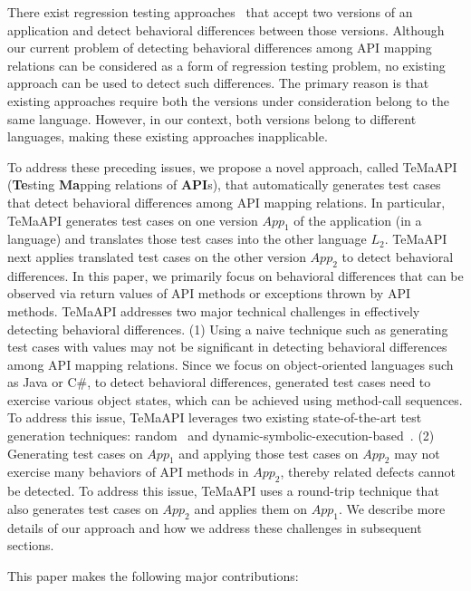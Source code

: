 There exist regression testing approaches~\cite{taneja08diffgen, robert07difference} that accept two versions of an application and detect behavioral differences between those versions. Although our current problem of detecting behavioral differences among API mapping relations can be considered as a form of regression testing problem, no existing approach can be used to detect such differences. The primary reason is that existing approaches require both the versions under consideration belong to the same language. However, in our context, both versions belong to different languages, making these existing approaches inapplicable. 

To address these preceding issues, we propose a novel approach, called TeMaAPI (\textbf{Te}sting \textbf{Ma}pping relations of \textbf{API}s), that automatically generates test cases that detect behavioral differences among API mapping relations. In particular, TeMaAPI generates test cases on one version $App_1$ of the application (in a language) and translates those test cases into the other language $L_2$. TeMaAPI next applies translated test cases on the other version $App_2$ to detect behavioral differences. In this paper, we primarily focus on behavioral differences that can be observed via return values of API methods or exceptions thrown by API methods. TeMaAPI addresses two major technical challenges in effectively detecting behavioral differences. (1) Using a naive technique such as generating test cases with  values may not be significant in detecting behavioral differences among API mapping relations. Since we focus on object-oriented languages such as Java or C\#, to detect behavioral differences, generated test cases need to exercise various object states, which can be achieved using method-call sequences. To address this issue, TeMaAPI leverages two existing state-of-the-art test generation techniques: random~\cite{pacheco2007feedback} and dynamic-symbolic-execution-based~\cite{koushik:cute, godefroid:dart, tillmann2008pex}. (2) Generating test cases on $App_1$ and applying those test cases on $App_2$ may not exercise many behaviors of API methods in $App_2$, thereby related defects cannot be detected. To address this issue, TeMaAPI uses a round-trip technique that also generates test cases on $App_2$ and applies them on $App_1$. We describe more details of our approach and how we address these challenges in subsequent sections.

This paper makes the following major contributions:

